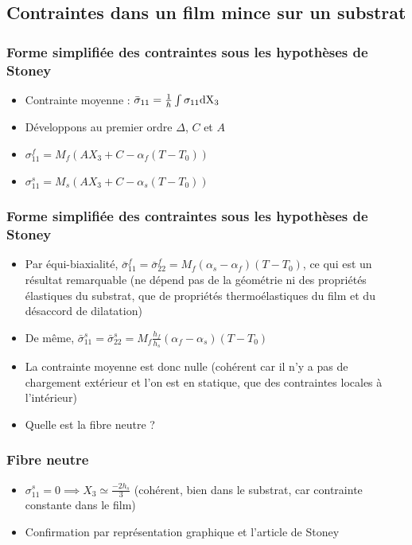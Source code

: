 \documentclass{beamer}
\begin{document}


\subsection{Contraintes dans un film mince sur un substrat} %

\begin{frame}
\frametitle{Forme simplifiée des contraintes sous les hypothèses de Stoney}
\begin{itemize}
    \item Contrainte moyenne : $\bar{\sigma}_{11}=\frac{1}{h}\int\sigma_{11}\rm{d}X_3$
    \item Développons au premier ordre $\Delta$, $C$ et $A$
    \item $\sigma_{11}^f=M_f(AX_3+C-\alpha_f(T-T_0))$
    \item $\sigma_{11}^s=M_s(AX_3+C-\alpha_s(T-T_0))$
\end{itemize}
\end{frame}


\begin{frame}
    \frametitle{Forme simplifiée des contraintes sous les hypothèses de Stoney}
    \begin{itemize}
        \item Par équi-biaxialité, $\bar{\sigma}_{11}^f=\bar{\sigma}_{22}^f=M_f(\alpha_s-\alpha_f)(T-T_0)$, ce qui est un résultat remarquable (ne dépend pas de la géométrie ni des propriétés élastiques du substrat, que de propriétés thermoélastiques du film et du désaccord de dilatation)
        \item De même, $\bar{\sigma}_{11}^s=\bar{\sigma}_{22}^s=M_f\frac{h_f}{h_s}(\alpha_f-\alpha_s)(T-T_0)$
        \item La contrainte moyenne est donc nulle (cohérent car il n'y a pas de chargement extérieur et l'on est en statique, que des contraintes locales à l'intérieur)
        \item Quelle est la fibre neutre ?
    \end{itemize}
\end{frame}


\begin{frame}
    \frametitle{Fibre neutre}
    \begin{itemize}
        \item $\sigma_{11}^s=0 \implies X_3 \simeq \frac{-2h_s}{3}$ (cohérent, bien dans le substrat, car contrainte constante dans le film)
        \item Confirmation par représentation graphique et l'article de Stoney
    \end{itemize}
\end{frame}
\end{document}
